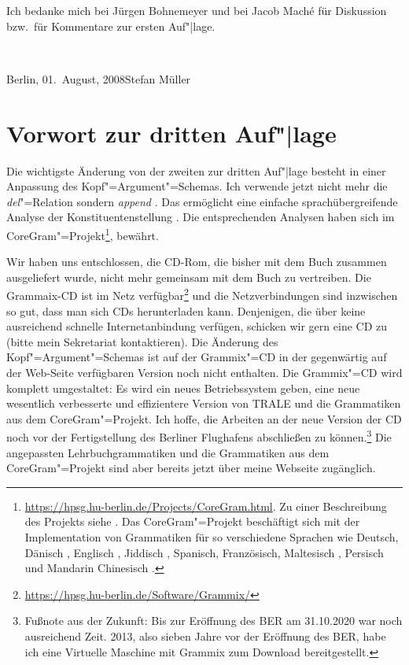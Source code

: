 Ich bedanke mich bei Jürgen Bohnemeyer und bei Jacob Maché für Diskussion bzw.\ für Kommentare zur
ersten Auf"|lage.

~\medskip

\noindent
Berlin, 01.\ August, 2008\hfill Stefan Müller

\section*{Vorwort zur dritten Auf"|lage}

Die wichtigste Änderung von der zweiten zur dritten Auf"|lage besteht in einer Anpassung des
Kopf"=Argument"=Schemas. Ich verwende jetzt nicht mehr die \emph{del}"=Relation sondern
\emph{append} \citep[Abschnitt~8.4]{MuellerGTBuch1}. Das ermöglicht eine einfache sprachübergreifende Analyse der Konstituentenstellung
\citep{MuellerCopula}. Die entsprechenden Analysen haben sich im CoreGram"=Projekt\footnote{
  \url{https://hpsg.hu-berlin.de/Projects/CoreGram.html}. Zu einer Beschreibung des Projekts siehe . Das CoreGram"=Projekt beschäftigt sich mit der Implementation von Grammatiken für so
verschiedene Sprachen wie Deutsch, Dänisch
\citep{MOe2011a,MuellerPredication,MuellerCopula,MOeDanish}, Englisch
\citep{MuellerPredication,MuellerCopula}, Jiddisch \citep{MOe2011a}, Spanisch, Französisch,
Maltesisch \citep{MuellerMalteseSketch},
Persisch \citep{MuellerPersian} und Mandarin Chinesisch \citep{Lipenkova2009a,ML2009a}.
}, bewährt. 

Wir haben uns entschlossen, die CD-Rom, die bisher mit dem Buch zusammen ausgeliefert wurde, nicht
mehr gemeinsam mit dem Buch zu vertreiben. Die Grammaix-CD \citep{Mueller2007b} ist im Netz verfügbar\footnote{
  \url{https://hpsg.hu-berlin.de/Software/Grammix/}
} und die Netzverbindungen sind inzwischen so gut, dass man sich CDs herunterladen kann. Denjenigen,
die über keine ausreichend schnelle Internetanbindung verfügen, schicken wir gern eine CD zu (bitte
mein Sekretariat kontaktieren). 
Die Änderung des Kopf"=Argument"=Schemas ist auf der Grammix"=CD in der gegenwärtig auf der
Web-Seite verfügbaren Version noch nicht enthalten. Die Grammix"=CD
wird komplett umgestaltet: Es wird ein neues Betriebssystem geben, eine neue wesentlich verbesserte
und effizientere Version von TRALE und die Grammatiken aus dem CoreGram"=Projekt. Ich hoffe, die
Arbeiten an der neue Version der CD noch vor der Fertigstellung des Berliner Flughafens abschließen
zu können.\footnote{Fußnote aus der Zukunft: Bis zur Eröffnung des BER am 31.10.2020 war noch
  ausreichend Zeit. 2013, also sieben Jahre vor der Eröffnung des BER, habe ich eine Virtuelle
  Maschine mit Grammix zum Download bereitgestellt.} Die angepassten Lehrbuchgrammatiken und die Grammatiken aus dem CoreGram"=Projekt sind
aber bereits jetzt über meine Webseite zugänglich.

